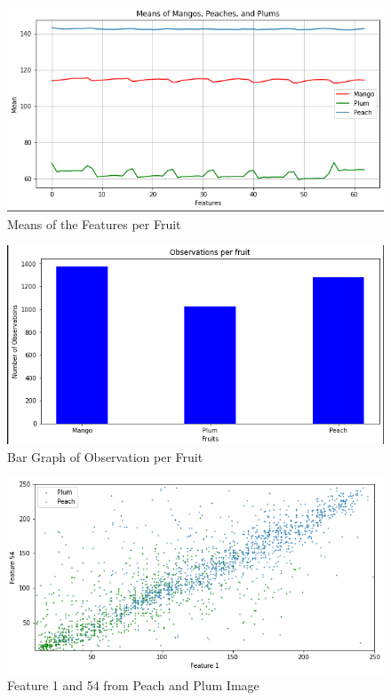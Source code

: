 \documentclass[conference]{IEEEtran}
\begin{document}
\begin{figure}[h]
  \centering
  \includegraphics[width=\linewidth]{feature_means.png}
  \caption{Means of the Features per Fruit}
\end{figure}

\begin{figure}[h]
  \centering
  \includegraphics[width=\linewidth]{observations_fruits.png}
  \caption{Bar Graph of Observation per Fruit}
\end{figure}

\begin{figure}[h]
  \centering
  \includegraphics[width=\linewidth]{feature_peach_plum.png}
  \caption{Feature 1 and 54 from Peach and Plum Image}
\end{figure}
\end{document}
